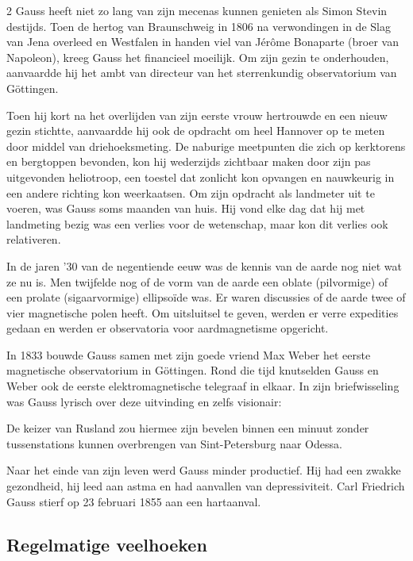 \begin{multicols}{2}
	Gauss heeft niet zo lang van zijn mecenas kunnen genieten als Simon Stevin destijds. Toen de hertog van Braunschweig in 1806 na verwondingen in de Slag van Jena overleed en Westfalen in handen viel van Jérôme Bonaparte (broer van Napoleon), kreeg Gauss het financieel moeilijk. Om zijn gezin te onderhouden, aanvaardde hij het ambt van directeur van het sterrenkundig observatorium van Göttingen. 
	
		
	Toen hij kort na het overlijden van zijn eerste vrouw hertrouwde en een nieuw gezin stichtte, aanvaardde hij ook de opdracht om heel Hannover op te meten door middel van driehoeksmeting. De naburige meetpunten die zich op kerktorens en bergtoppen bevonden, kon hij wederzijds zichtbaar maken door zijn pas uitgevonden heliotroop, een toestel dat zonlicht kon opvangen en nauwkeurig in een andere richting kon weerkaatsen. Om zijn opdracht als landmeter uit te voeren, was Gauss soms maanden van huis. Hij vond elke dag dat hij met landmeting bezig was een verlies voor de wetenschap, maar kon dit verlies ook relativeren.

	
	In de jaren '30 van de negentiende eeuw was de kennis van de aarde nog niet wat ze nu is. Men twijfelde nog of de vorm van de aarde een oblate (pilvormige) of een prolate (sigaarvormige) ellipsoïde was. Er waren discussies of de aarde twee of vier magnetische polen heeft. Om uitsluitsel te geven, werden er verre expedities gedaan en werden er observatoria voor aardmagnetisme opgericht. 
	
	In 1833 bouwde Gauss samen met zijn goede vriend Max Weber het eerste magnetische observatorium in Göttingen. Rond die tijd knutselden Gauss en Weber ook de eerste elektromagnetische telegraaf in elkaar. In zijn briefwisseling was Gauss lyrisch over deze uitvinding en zelfs visionair: 
	\begin{citaat}
		De keizer van Rusland zou hiermee zijn bevelen binnen een minuut zonder tussenstations kunnen overbrengen van Sint-Petersburg naar Odessa.
	\end{citaat}
	
	Naar het einde van zijn leven werd Gauss minder productief. Hij had een zwakke gezondheid, hij leed aan astma en had aanvallen van depressiviteit. Carl Friedrich Gauss stierf op 23 februari 1855 aan een hartaanval.
	
	\subsection*{Regelmatige veelhoeken}  
	

\end{multicols}
